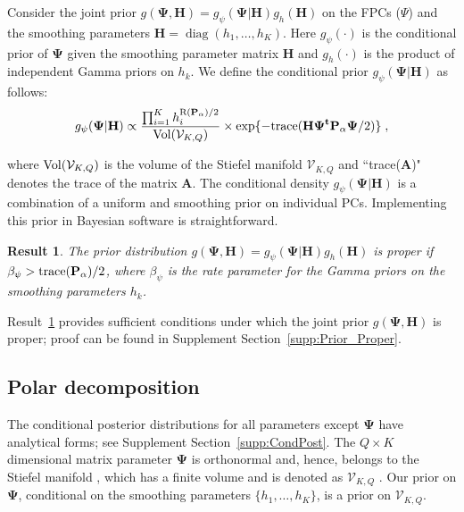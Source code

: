 \documentclass[12pt]{article}
\DeclareMathOperator{\diag}{diag}
\newtheorem{result}{Result}
\begin{document}
Consider the joint prior $g(\boldsymbol{\Psi}, \mathbf{H}) = g_\psi(\boldsymbol{\Psi}|\mathbf{H}) g_h(\mathbf{H})$ on the FPCs ($\Psi$) and the smoothing parameters $\mathbf{H} = \diag(h_1, \ldots, h_K)$. Here $g_\psi(\cdot)$ is the conditional prior of $\boldsymbol{\Psi}$ given the smoothing parameter matrix $\mathbf{H}$ and $g_h(\cdot)$ is the product of independent Gamma priors on $h_k$. We define the conditional prior $g_\psi(\boldsymbol{\Psi}|\mathbf{H})$ as follows:
\begin{equation*}
g_\psi(\boldsymbol{\Psi}|\mathbf{H}) \propto \frac{\prod_{i = 1}^K h_i^{{\rm R}(\mathbf{P}_\alpha)/2}}{{\rm Vol}(\mathcal{V}_{K,Q})} \times \text{\rm exp}\{-{\rm trace}(\mathbf{H \boldsymbol{\Psi}^t \mathbf{P}_\alpha}\boldsymbol{\Psi}/2)\}\;,
\end{equation*}

\noindent where ${\rm Vol}(\mathcal{V}_{K, Q})$ is the volume of the Stiefel manifold $\mathcal{V}_{K, Q}$ and ``trace($\boldsymbol{A}$)" denotes the trace of the matrix $\boldsymbol{A}$. The conditional density $g_\psi(\boldsymbol{\Psi}|\mathbf{H})$ is a combination of a uniform and smoothing prior on individual PCs. Implementing this prior in Bayesian software is straightforward. 

\begin{result} \label{Thm:Prior}
The prior distribution $g(\boldsymbol{\Psi}, \mathbf{H}) = g_\psi(\boldsymbol{\Psi}|\mathbf{H}) g_h(\mathbf{H})$ is proper if $\beta_\psi > {\rm trace}(\mathbf{P}_\alpha)/2$, where $\beta_\psi$ is the rate parameter for the Gamma priors on the smoothing parameters $h_k$.
\end{result}

Result~\ref{Thm:Prior} provides sufficient conditions under which the joint prior $g(\boldsymbol{\Psi}, \mathbf{H})$ is proper; proof can be found in Supplement Section~\ref{supp:Prior_Proper}. 

\subsection{Polar decomposition}\label{subsec:polar_decomp}

The conditional posterior distributions for all parameters except $\boldsymbol{\Psi}$ have analytical forms; see Supplement Section~\ref{supp:CondPost}. The $Q \times K$ dimensional matrix parameter $\boldsymbol{\Psi}$ is orthonormal and, hence, belongs to the Stiefel manifold \citep{james1976}, which has a finite volume and is denoted as $\mathcal{V}_{K,Q}$ \citep{chikuse_statistics_2003, MARDIA1977468}. Our prior on $\mathbf{\Psi}$, conditional on the smoothing parameters $\{h_1,\ldots, h_K\}$, is a prior on $\mathcal{V}_{K,Q}$.
\end{document}
